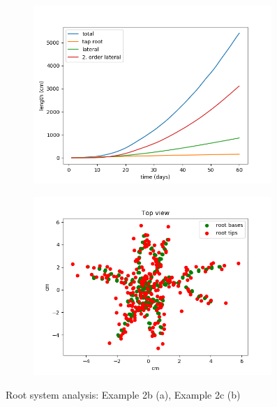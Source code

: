 \begin{figure}
\begin{subfigure}[c]{0.5\textwidth}
\includegraphics[width=0.99\textwidth]{example_3a.png}
 \label{fig:length}
\end{subfigure}
\begin{subfigure}[c]{0.5\textwidth}
\includegraphics[width=0.99\textwidth]{example_3b.png}
 \label{fig:scatter}
\end{subfigure}
\caption{Root system analysis: Example 2b (a), Example 2c (b)} 
\end{figure}



